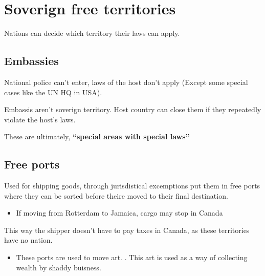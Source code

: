 
\section{Soverign free territories} 

Nations can decide which territory their laws can apply.

\subsection{Embassies}
National police can't enter, laws of the host don't apply (Except some special cases like the UN HQ in USA).

Embassis aren't soverign territory. Host country can close them if they repeatedly violate the host's laws.

These are ultimately, \textbf{``special areas with special laws''}


\subsection{Free ports}
Used for shipping goods, through jurisdistical excemptions put them in free ports where they can be sorted before theire moved to their final destination.
\begin{itemize}
	\item	If moving from Rotterdam to Jamaica, cargo may stop in Canada 
\end{itemize}

This way the shipper doesn't have to pay taxes in Canada, as these territories have no nation.
\begin{itemize}
	\item These ports are used to move art. . This art is used as a way of collecting wealth by shaddy buisness.
\end{itemize}


